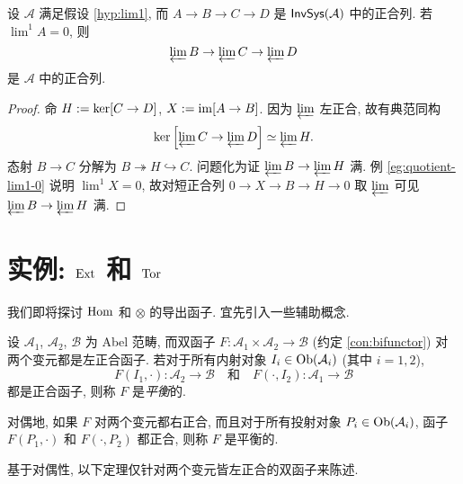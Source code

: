 \begin{corollary}\label{prop:ML-4-terms}
	设 $\mathcal{A}$ 满足假设 \ref{hyp:lim1}, 而 $A \to B \to C \to D$ 是 $\mathsf{InvSys}(\mathcal{A})$ 中的正合列. 若 $\lim^1 A = 0$, 则
	\[ \varprojlim B \to \varprojlim C \to \varprojlim D \]
	是 $\mathcal{A}$ 中的正合列.
\end{corollary}
\begin{proof}
	命 $H := \operatorname{ker}[C \to D]$, $X := \operatorname{im}[A \to B]$. 因为 $\varprojlim$ 左正合, 故有典范同构
	\[ \operatorname{ker}\left[ \varprojlim C \to \varprojlim D\right] \simeq \varprojlim H . \]
	态射 $B \to C$ 分解为 $B \twoheadrightarrow H \hookrightarrow C$. 问题化为证 $\varprojlim B \to \varprojlim H$ 满. 例 \ref{eg:quotient-lim1-0} 说明 $\lim^1 X = 0$, 故对短正合列 $0 \to X \to B \to H \to 0$ 取 $\varprojlim$ 可见 $\varprojlim B \to \varprojlim H$ 满.
\end{proof}

\section{实例: \texorpdfstring{$\operatorname{Ext}$}{Ext} 和 \texorpdfstring{$\operatorname{Tor}$}{Tor}}\label{sec:Ext-Tor}
我们即将探讨 $\operatorname{Hom}$ 和 $\otimes$ 的导出函子. 宜先引入一些辅助概念.

\begin{definition}\label{def:balanced-functor}
	设 $\mathcal{A}_1$, $\mathcal{A}_2$, $\mathcal{B}$ 为 Abel 范畴, 而双函子 $F: \mathcal{A}_1 \times \mathcal{A}_2 \to \mathcal{B}$ (约定 \ref{con:bifunctor}) 对两个变元都是左正合函子. 若对于所有内射对象 $I_i \in \operatorname{Ob}(\mathcal{A}_i)$ (其中 $i = 1, 2$),
	\[ F(I_1, \cdot): \mathcal{A}_2 \to \mathcal{B} \quad \text{和}\quad F(\cdot, I_2): \mathcal{A}_1 \to \mathcal{B} \]
	都是正合函子, 则称 $F$ 是\emph{平衡}的.
	
	对偶地, 如果 $F$ 对两个变元都右正合, 而且对于所有投射对象 $P_i \in \operatorname{Ob}(\mathcal{A}_i)$, 函子 $F(P_1, \cdot)$ 和 $F(\cdot, P_2)$ 都正合, 则称 $F$ 是平衡的.
\end{definition}

基于对偶性, 以下定理仅针对两个变元皆左正合的双函子来陈述.

